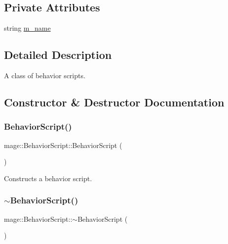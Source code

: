 \subsection*{Private Attributes}
\begin{DoxyCompactItemize}
\item 
string \hyperlink{classmage_1_1_behavior_script_a3e55dd6e720dc72c3f613b917e73344b}{m\+\_\+name}
\end{DoxyCompactItemize}


\subsection{Detailed Description}
A class of behavior scripts. 

\subsection{Constructor \& Destructor Documentation}
\hypertarget{classmage_1_1_behavior_script_a90ac6d3397f54ad95a931c9ef2c47549}{}\label{classmage_1_1_behavior_script_a90ac6d3397f54ad95a931c9ef2c47549} 
\subsubsection{\texorpdfstring{Behavior\+Script()}{BehaviorScript()}\hspace{0.1cm}{\footnotesize\ttfamily [1/3]}}
{\footnotesize\ttfamily mage\+::\+Behavior\+Script\+::\+Behavior\+Script (\begin{DoxyParamCaption}{ }\end{DoxyParamCaption})\hspace{0.3cm}{\ttfamily [default]}}

Constructs a behavior script. \hypertarget{classmage_1_1_behavior_script_a1cc4b4f909124615af4f49f2327c233e}{}\label{classmage_1_1_behavior_script_a1cc4b4f909124615af4f49f2327c233e} 
\subsubsection{\texorpdfstring{$\sim$\+Behavior\+Script()}{~BehaviorScript()}}
{\footnotesize\ttfamily mage\+::\+Behavior\+Script\+::$\sim$\+Behavior\+Script (\begin{DoxyParamCaption}{ }\end{DoxyParamCaption})\hspace{0.3cm}{\ttfamily [default]}}

